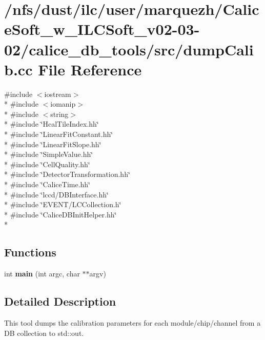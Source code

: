 \section{/nfs/dust/ilc/user/marquezh/\-Calice\-Soft\-\_\-w\-\_\-\-I\-L\-C\-Soft\-\_\-v02-\/03-\/02/calice\-\_\-db\-\_\-tools/src/dump\-Calib.cc File Reference}
\label{dumpCalib_8cc}
{\ttfamily \#include $<$iostream$>$}\\*
{\ttfamily \#include $<$iomanip$>$}\\*
{\ttfamily \#include $<$string$>$}\\*
{\ttfamily \#include \char`\"{}Hcal\-Tile\-Index.\-hh\char`\"{}}\\*
{\ttfamily \#include \char`\"{}Linear\-Fit\-Constant.\-hh\char`\"{}}\\*
{\ttfamily \#include \char`\"{}Linear\-Fit\-Slope.\-hh\char`\"{}}\\*
{\ttfamily \#include \char`\"{}Simple\-Value.\-hh\char`\"{}}\\*
{\ttfamily \#include \char`\"{}Cell\-Quality.\-hh\char`\"{}}\\*
{\ttfamily \#include \char`\"{}Detector\-Transformation.\-hh\char`\"{}}\\*
{\ttfamily \#include \char`\"{}Calice\-Time.\-hh\char`\"{}}\\*
{\ttfamily \#include \char`\"{}lccd/\-D\-B\-Interface.\-hh\char`\"{}}\\*
{\ttfamily \#include \char`\"{}E\-V\-E\-N\-T/\-L\-C\-Collection.\-h\char`\"{}}\\*
{\ttfamily \#include \char`\"{}Calice\-D\-B\-Init\-Helper.\-hh\char`\"{}}\\*
\subsection*{Functions}
\begin{DoxyCompactItemize}
\item 
int {\bfseries main} (int argc, char $\ast$$\ast$argv)\label{dumpCalib_8cc_a3c04138a5bfe5d72780bb7e82a18e627}

\end{DoxyCompactItemize}


\subsection{Detailed Description}
This tool dumps the calibration parameters for each module/chip/channel from a D\-B collection to std\-::out.

